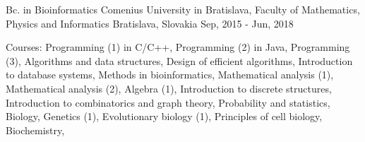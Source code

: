 \begin{cventries}
  \cventry
    {Bc. in Bioinformatics} %
    {Comenius University in Bratislava, Faculty of Mathematics, Physics and Informatics} %
    {Bratislava, Slovakia} %
    {Sep, 2015 - Jun, 2018} %
    {
      \begin{cvitems} %
        \item {Courses: 
        Programming (1) in C/C++, 
        Programming (2) in Java, 
        Programming (3), 
        Algorithms and data structures, 
        Design of efficient algorithms, 
        Introduction to database systems, 
        Methods in bioinformatics, 
        Mathematical analysis (1), 
        Mathematical analysis (2),
        Algebra (1),
        Introduction to discrete structures,
        Introduction to combinatorics and graph theory, 
        Probability and statistics, 
        Biology, 
        Genetics (1), 
        Evolutionary biology (1), 
        Principles of cell biology, 
        Biochemistry, 
        }
      \end{cvitems}
    }

\end{cventries}
